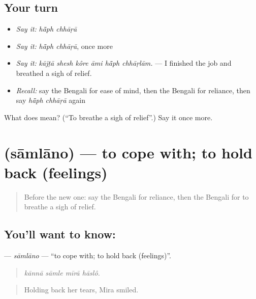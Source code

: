 \subsection*{Your turn}
\begin{itemize}
\raggedright
  \item \emph{Say it:} \emph{hā̃ph chhāṛā}
  \item \emph{Say it:} \emph{hā̃ph chhāṛā}, once more
  \item \emph{Say it:} \emph{kājṭā shesh kôre āmi hā̃ph chhāṛlām.} — I finished the job and breathed a sigh of relief.
  \item \emph{Recall:} say the Bengali for ease of mind, then the Bengali for reliance, then say \emph{hā̃ph chhāṛā} again
\end{itemize}

\begin{tcolorbox}[breakable,colback=teal!4,colframe=teal!35!black,title={Before you move on}]
What does   mean? (\textquotedblleft{}To breathe a sigh of relief\textquotedblright{}.) Say it once more.
\end{tcolorbox}
\section[\texorpdfstring{\bn{সামলানো} (sāmlāno)}{সামলানো (sāmlāno)}]{ (sāmlāno) — to cope with; to hold back (feelings)}

\label{lesson:BN-C446-samlano}



\begin{quote}
Before the new one: say the Bengali for reliance, then the Bengali for to breathe a sigh of relief.
\end{quote}

\subsection*{You'll want to know: }
\textbf{} — \emph{sāmlāno} — \textquotedblleft{}to cope with; to hold back (feelings)\textquotedblright{}.

\begin{quote}
   
\end{quote}

\begin{quote}
\emph{kānnā sāmle mīrā hāslô.}
\end{quote}

\begin{quote}
Holding back her tears, Mira smiled.
\end{quote}

